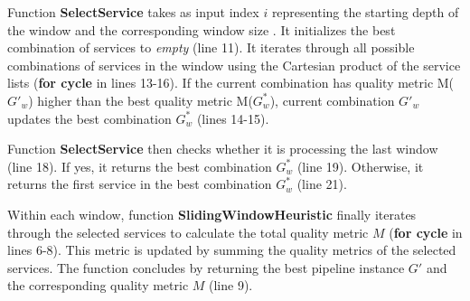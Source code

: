 Function \textbf{SelectService} takes as input index $i$ representing the starting depth of the window and the corresponding window size \windowsize. It initializes the best combination of services to \textit{empty} (line 11). It iterates through all possible combinations of services in the window using the Cartesian product of the service lists (\textbf{for cycle} in lines 13-16). If the current combination has quality metric M($G'_w$) higher than the best quality metric M($G^*_w$), current combination $G'_w$ updates the best combination $G^*_w$ (lines 14-15).

Function \textbf{SelectService} then checks whether it is processing the last window (line 18). If yes, it returns the best combination $G^*_w$ (line 19). Otherwise, it returns the first service in the best combination $G^*_w$ (line 21).

Within each window, function \textbf{SlidingWindowHeuristic} finally iterates through the selected services to calculate the total quality metric $M$ (\textbf{for cycle} in lines 6-8). This metric is updated by summing the quality metrics of the selected services. The function concludes by returning the best pipeline instance $G'$ and the corresponding quality metric $M$ (line 9).